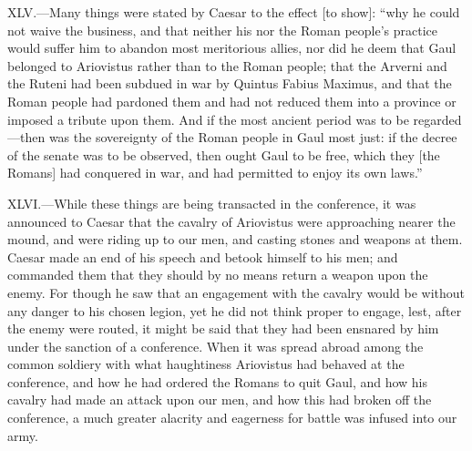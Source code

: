 XLV.—Many things were stated by Caesar to the effect [to show]: ``why he
could not waive the business, and that neither his nor the Roman
people's practice would suffer him to abandon most meritorious allies,
nor did he deem that Gaul belonged to Ariovistus rather than to the
Roman people; that the Arverni and the Ruteni had been subdued in war by
Quintus Fabius Maximus, and that the Roman people had pardoned them and
had not reduced them into a province or imposed a tribute upon them. And
if the most ancient period was to be regarded—then was the sovereignty
of the Roman people in Gaul most just: if the decree of the senate was
to be observed, then ought Gaul to be free, which they [the Romans] had
conquered in war, and had permitted to enjoy its own laws.''

XLVI.—While these things are being transacted in the conference, it was
announced to Caesar that the cavalry of Ariovistus were approaching
nearer the mound, and were riding up to our men, and casting stones and
weapons at them. Caesar made an end of his speech and betook himself to
his men; and commanded them that they should by no means return a weapon
upon the enemy. For though he saw that an engagement with the cavalry
would be without any danger to his chosen legion, yet he did not think
proper to engage, lest, after the enemy were routed, it might be said
that they had been ensnared by him under the sanction of a conference.
When it was spread abroad among the common soldiery with what
haughtiness Ariovistus had behaved at the conference, and how he had
ordered the Romans to quit Gaul, and how his cavalry had made an attack
upon our men, and how this had broken off the conference, a much greater
alacrity and eagerness for battle was infused into our army.

